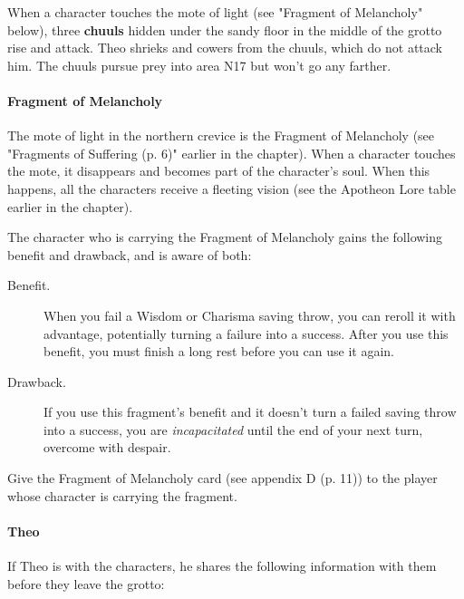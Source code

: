 \documentclass[a4paper, 11pt, bg=full, twocolumn, nooutline]{dndbook}
\begin{document}
When a character touches the mote of light (see "Fragment of Melancholy" below), three \textbf{chuuls} hidden under the sandy floor in the middle of the grotto rise and attack. Theo shrieks and cowers from the chuuls, which do not attack him. The chuuls pursue prey into area N17 but won't go any farther.

\paragraph{Fragment of Melancholy}

The mote of light in the northern crevice is the Fragment of Melancholy (see "Fragments of Suffering (p. 6)" earlier in the chapter). When a character touches the mote, it disappears and becomes part of the character's soul. When this happens, all the characters receive a fleeting vision (see the Apotheon Lore table earlier in the chapter).

The character who is carrying the Fragment of Melancholy gains the following benefit and drawback, and is aware of both:

\begin{DndSidebar}{}
\begin{description}
\item[Benefit.] When you fail a Wisdom or Charisma saving throw, you can reroll it with advantage, potentially turning a failure into a success. After you use this benefit, you must finish a long rest before you can use it again.
\item[Drawback.] If you use this fragment's benefit and it doesn't turn a failed saving throw into a success, you are \textit{incapacitated} until the end of your next turn, overcome with despair.
\end{description}
\end{DndSidebar}

Give the Fragment of Melancholy card (see appendix D (p. 11)) to the player whose character is carrying the fragment.

\paragraph{Theo}

If Theo is with the characters, he shares the following information with them before they leave the grotto:
\end{document}
